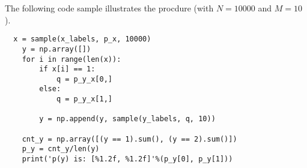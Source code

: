 \documentclass[11pt,onecolumn]{article}
\begin{document}
The following code sample illustrates the procdure (with $N = 10000$ and $M = 10$).
\begin{verbatim}
  x = sample(x_labels, p_x, 10000)
    y = np.array([])
    for i in range(len(x)):
        if x[i] == 1:
            q = p_y_x[0,]
        else:
            q = p_y_x[1,]

        y = np.append(y, sample(y_labels, q, 10))

    cnt_y = np.array([(y == 1).sum(), (y == 2).sum()])
    p_y = cnt_y/len(y)
    print('p(y) is: [%1.2f, %1.2f]'%(p_y[0], p_y[1]))

\end{verbatim}
\end{document}
